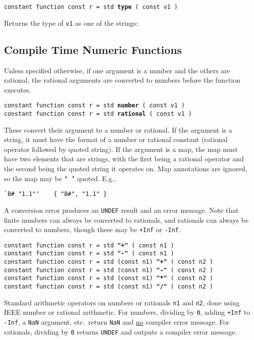 \documentclass[12pt]{article}
\newcommand{\TT}[1]{{\tt \bfseries #1}}
\newcommand{\ttkey}[1]{{\tt \bfseries #1}}
\newenvironment{indpar}[1][0.3in]%
	{\begin{list}{}%
		     {\setlength{\itemsep}{0in}%
		      \setlength{\topsep}{0in}%
		      \setlength{\parsep}{1ex}%
		      \setlength{\labelwidth}{#1}%
		      \setlength{\leftmargin}{#1}%
		      \addtolength{\leftmargin}{\labelsep}}%
	 \item}%
	{\end{list}}
\begin{document}
{\tt constant function const r = std \ttkey{type} ( const v1 )}
\begin{indpar}
Returns the type of {\tt v1} as one of the strings: \\
\hspace*{0.5in}{\tt
"special" ~  "number" ~ "rational" ~ "string" ~ \tt "map"}
\end{indpar}


\subsection{Compile Time Numeric Functions}

Unless specified otherwise,
if one argument is a number and the others are rational,
the rational arguments are converted to numbers before
the function executes.

{\tt constant function const r = std \ttkey{number} ( const v1 )} \\
{\tt constant function const r = std \ttkey{rational} ( const v1 )}
\begin{indpar}
These convert their argument to a number or rational.  If
the argument is a string, it must have the format of
a number or rational constant (rational operator followed
by quoted string).
If the argument is a map, the map must have two elements
that are strings, with the first being a rational operator
and the second being the quoted string it operates on.
Map annotations are ignored, so the map may be
\TT{`~'} quoted.  E.g.,
\begin{indpar}\begin{verbatim}
`B# "1.1"'    { "B#", "1.1" }
\end{verbatim}\end{indpar}


A conversion
error produces an {\tt UNDEF} result and an error message.
Note that finite numbers can always be converted to rationals,
and rationals can always be converted to numbers, though these
may be {\tt +Inf} or {\tt -Inf}.
\end{indpar}

{\tt constant function const r = std \ttkey{"+"} ( const n1 )} \\
{\tt constant function const r = std \ttkey{"-"} ( const n1 )} \\
{\tt constant function const r = std (const n1) \ttkey{"+"} ( const n2 )} \\
{\tt constant function const r = std (const n1) \ttkey{"-"} ( const n2 )} \\
{\tt constant function const r = std (const n1) \ttkey{"*"} ( const n2 )} \\
{\tt constant function const r = std (const n1) \ttkey{"/"} ( const n2 )}
\begin{indpar}
Standard arithmetic operators on numbers or rationals {\tt n1} and {\tt n2},
done using IEEE number or rational arithmetic.
For numbers, dividing by {\tt 0},
adding {\tt +Inf} to {\tt -Inf}, a {\tt NaN} argument, etc.~return
{\tt NaN} and \underline{no} compiler error message.
For rationals, dividing by {\tt 0} returns {\tt UNDEF} and outputs a
compiler error message.
\end{indpar}
\end{document}
